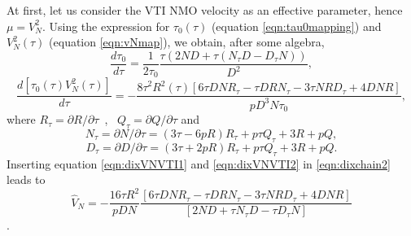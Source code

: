 At first, let us consider the VTI NMO velocity as an effective parameter,
hence ${\mu =}V_{N}^{2}$.  Using the expression for ${\tau _{0}(\tau
)}$ (equation \ref{eqn:tau0mapping}) and $V_{N}^{2}{(\tau )}$
(equation \ref{eqn:vNmap}), we obtain, after some algebra, 
\begin{equation}
\frac{{d\tau _{0}}}{{d\tau }}=\frac{1}{{2\tau _{0}}}\frac{{\tau (2ND+\tau
(N_{\tau }D-D_{\tau }N))}}{{D^{2}}},  \label{eqn:dixVNVTI1}
\end{equation}%
\begin{equation}
\frac{{d\left[ {\tau _{0}(\tau )V_{N}^{2}(\tau )}\right] }}{{d\tau }}=
-\frac{{8\tau }^{2}{R^{2}(\tau )\left[ {6\tau DNR_{\tau }-\tau DRN_{\tau }-3\tau
NRD_{\tau }+4DNR}\right] }}{{pD^{3}N\tau _{0}}}, \label{eqn:dixVNVTI2}
\end{equation}
where ${R_{\tau }=}\partial {R/}\partial \tau $~,~ ${Q_{\tau }=}\partial {Q/}\partial \tau $ and
\begin{equation}
N_{\tau }=\partial N/\partial \tau =\left( {3\tau -6pR}\right) R_{\tau
}+p\tau Q_{\tau }+3R+pQ,  \label{eqn:numerator_tau}
\end{equation}%
\begin{equation}
D_{\tau }=\partial D/\partial \tau =\left( {3\tau +2pR}\right) R_{\tau
}+p\tau Q_{\tau }+3R+pQ.  \label{eqn:denominator_tau}
\end{equation}
Inserting equation \ref{eqn:dixVNVTI1} and \ref{eqn:dixVNVTI2}
in \ref{eqn:dixchain2} leads to
\begin{equation}
\hat{V}_{N}=-\frac{{16\tau R^{2}}}{{pDN}}\frac{{\left[ {6\tau DNR_{\tau
}-\tau DRN_{\tau }-3\tau NRD_{\tau }+4DNR}\right] }}{{\left[ {2ND+\tau
N_{\tau }D-\tau D_{\tau }N}\right] }}  \label{eqn:vNdixVTI}
\end{equation}.

